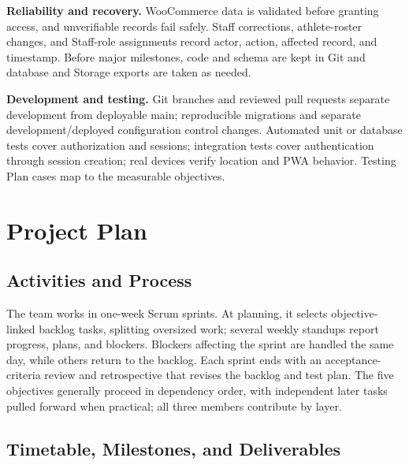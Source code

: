 \documentclass[11pt,letterpaper]{article}
\begin{document}
\textbf{Reliability and recovery.} WooCommerce data is validated before granting access, and unverifiable records fail safely. Staff corrections, athlete-roster changes, and Staff-role assignments record actor, action, affected record, and timestamp. Before major milestones, code and schema are kept in Git and database and Storage exports are taken as needed.

\textbf{Development and testing.} Git branches and reviewed pull requests separate development from deployable main; reproducible migrations and separate development/deployed configuration control changes. Automated unit or database tests cover authorization and sessions; integration tests cover authentication through session creation; real devices verify location and PWA behavior. Testing Plan cases map to the measurable objectives.

\section{Project Plan}

\subsection{Activities and Process}

The team works in one-week Scrum sprints. At planning, it selects objective-linked backlog tasks, splitting oversized work; several weekly standups report progress, plans, and blockers. Blockers affecting the sprint are handled the same day, while others return to the backlog. Each sprint ends with an acceptance-criteria review and retrospective that revises the backlog and test plan. The five objectives generally proceed in dependency order, with independent later tasks pulled forward when practical; all three members contribute by layer.

\subsection{Timetable, Milestones, and Deliverables}
\end{document}
